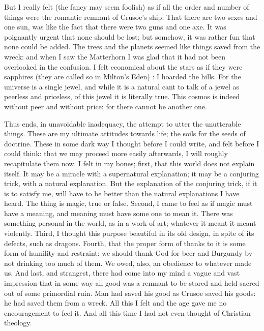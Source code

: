 \documentclass{book}
\begin{document}
But I really felt (the fancy may seem foolish) as if all the order and number of things were the romantic remnant of Crusoe’s ship. That there are two sexes and one sun, was like the fact that there were two guns and one axe. It was poignantly urgent that none should be lost; but somehow, it was rather fun that none could be added. The trees and the planets seemed like things saved from the wreck: and when I saw the Matterhorn I was glad that it had not been overlooked in the confusion. I felt economical about the stars as if they were sapphires (they are called so in Milton’s Eden) : I hoarded the hills. For the universe is a single jewel, and while it is a natural cant to talk of a jewel as peerless and priceless, of this jewel it is literally true. This cosmos is indeed without peer and without price: for there cannot be another one.

Thus ends, in unavoidable inadequacy, the attempt to utter the unutterable things. These are my ultimate attitudes towards life; the soils for the seeds of doctrine. These in some dark way I thought before I could write, and felt before I could think: that we may proceed more easily afterwards, I will roughly recapitulate them now. I felt in my bones; first, that this world does not explain itself. It may be a miracle with a supernatural explanation; it may be a conjuring trick, with a natural explanation. But the explanation of the conjuring trick, if it is to satisfy me, will have to be better than the natural explanations I have heard. The thing is magic, true or false. Second, I came to feel as if magic must have a meaning, and meaning must have some one to mean it. There was something personal in the world, as in a work of art; whatever it meant it meant violently. Third, I thought this purpose beautiful in its old design, in spite of its defects, such as dragons. Fourth, that the proper form of thanks to it is some form of humility and restraint: we should thank God for beer and Burgundy by not drinking too much of them. We owed, also, an obedience to whatever made us. And last, and strangest, there had come into my mind a vague and vast impression that in some way all good was a remnant to be stored and held sacred out of some primordial ruin. Man had saved his good as Crusoe saved his goods: he had saved them from a wreck. All this I felt and the age gave me no encouragement to feel it. And all this time I had not even thought of Christian theology.
\end{document}

